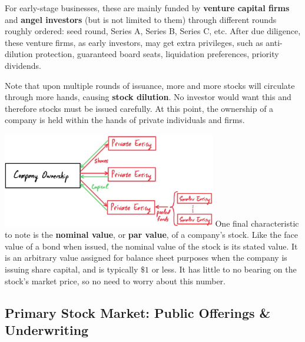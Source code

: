 \documentclass{article}
\begin{document}
    For early-stage businesses, these are mainly funded by \textbf{venture capital firms} and \textbf{angel investors} (but is not limited to them) through different rounds roughly ordered: seed round, Series A, Series B, Series C, etc. After due diligence, these venture firms, as early investors, may get extra privileges, such as anti-dilution protection, guaranteed board seats, liquidation preferences, priority dividends. 

    Note that upon multiple rounds of issuance, more and more stocks will circulate through more hands, causing \textbf{stock dilution}. No investor would want this and therefore stocks must be issued carefully. At this point, the ownership of a company is held within the hands of private individuals and firms. 
    \begin{center}
    \end{center}
      \includegraphics[width=0.7\textwidth]{img/company_in_private_hands.jpg}
    One final characteristic to note is the \textbf{nominal value}, or \textbf{par value}, of a company's stock. Like the face value of a bond when issued, the nominal value of the stock is its stated value. It is an arbitrary value assigned for balance sheet purposes when the company is issuing share capital, and is typically $\$1$ or less. It has little to no bearing on the stock's market price, so no need to worry about this number. 

  \subsection{Primary Stock Market: Public Offerings \& Underwriting}
\end{document}
